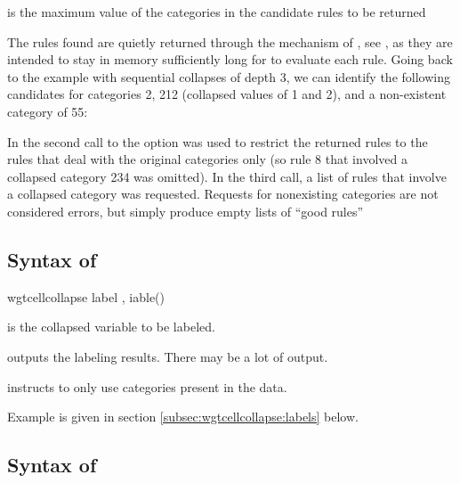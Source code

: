 \hangpara
{} is the maximum value of the categories in the candidate rules to be returned

The rules found are quietly returned through the mechanism of ,
see , as they are intended to stay in memory sufficiently long for
 to evaluate each rule. Going back to the example
with sequential collapses of depth 3, we can identify the following candidates
for categories 2, 212 (collapsed values of 1 and 2), and a non-existent category of 55:

\cnp

\begin{stlog}
\nullskip
\end{stlog}

In the second call to
the option  was used to restrict the returned rules to the rules
that deal with the original categories only (so rule 8 that involved a collapsed category 234
was omitted). In the third call, a list of rules
that involve a collapsed category  was requested. Requests
for nonexisting categories are not considered errors, but simply produce empty lists
of ``good rules''

\subsection{Syntax of }

\begin{stsyntax}
wgtcellcollapse label
,
iable(\varname)
\end{stsyntax}

\hangpara
{} is the collapsed variable to be labeled.

\hangpara
{} outputs the labeling results. There may be a lot of output.

\hangpara
{} instructs  to only use categories present in the data.

Example is given in section \ref{subsec:wgtcellcollapse:labels} below.

\subsection{Syntax of }


